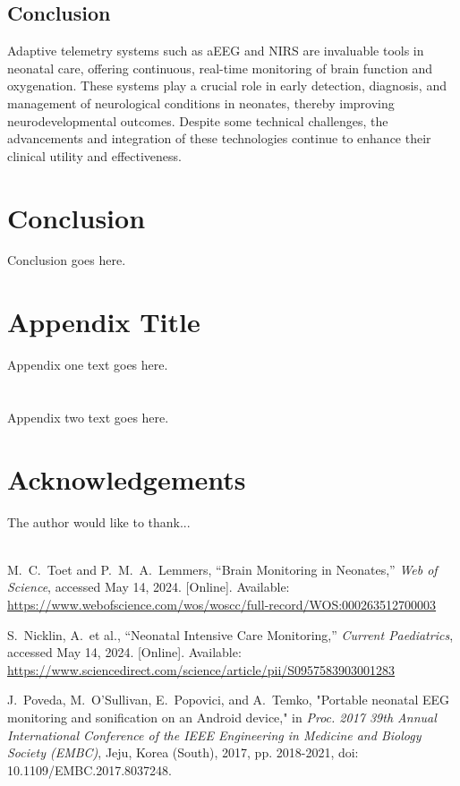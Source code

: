 \documentclass[12pt,journal,compsoc]{IEEEtran}
\begin{document}
\subsection{Conclusion}
Adaptive telemetry systems such as aEEG and NIRS are invaluable tools in neonatal care, offering continuous, real-time monitoring of brain function and oxygenation. These systems play a crucial role in early detection, diagnosis, and management of neurological conditions in neonates, thereby improving neurodevelopmental outcomes. Despite some technical challenges, the advancements and integration of these technologies continue to enhance their clinical utility and effectiveness.


\section{Conclusion}
Conclusion goes here.

\appendices
\section{Appendix Title}
Appendix one text goes here.

\section{}
Appendix two text goes here.


\section*{Acknowledgements}

The author would like to thank...\\ \\

\begin{thebibliography}{1}

M.~C.~Toet and P.~M.~A.~Lemmers, “Brain Monitoring in Neonates,” \emph{Web of Science}, accessed May 14, 2024. [Online]. Available: \url{https://www.webofscience.com/wos/woscc/full-record/WOS:000263512700003}

S.~Nicklin, A.~et al., “Neonatal Intensive Care Monitoring,” \emph{Current Paediatrics}, accessed May 14, 2024. [Online]. Available: \url{https://www.sciencedirect.com/science/article/pii/S0957583903001283}

J.~Poveda, M.~O'Sullivan, E.~Popovici, and A.~Temko, "Portable neonatal EEG monitoring and sonification on an Android device," in \emph{Proc. 2017 39th Annual International Conference of the IEEE Engineering in Medicine and Biology Society (EMBC)}, Jeju, Korea (South), 2017, pp. 2018-2021, doi: 10.1109/EMBC.2017.8037248.

\end{thebibliography}
\end{document}

